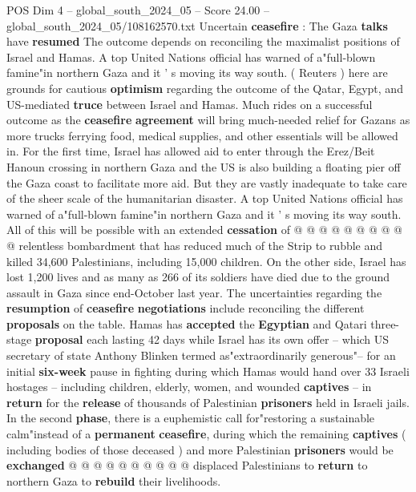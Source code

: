 \begin{textsample}{POS Dim 4 – global\_south\_2024\_05 – Score 24.00 – global\_south\_2024\_05/108162570.txt}  \label{ex:f4_pos_185}
Uncertain \textbf{ceasefire} : The Gaza \textbf{talks} have \textbf{resumed} The outcome depends on reconciling the maximalist positions of Israel and Hamas.
A top United Nations official has warned of a"full-blown famine"in northern Gaza and it ' s moving its way south. ( Reuters ) here are grounds for cautious \textbf{optimism} regarding the outcome of the Qatar, Egypt, and US-mediated \textbf{truce} between Israel and Hamas.
Much rides on a successful outcome as the \textbf{ceasefire} \textbf{agreement} will bring much-needed relief for Gazans as more trucks ferrying food, medical supplies, and other essentials will be allowed in.
For the first time, Israel has allowed aid to enter through the Erez/Beit Hanoun crossing in northern Gaza and the US is also building a floating pier off the Gaza coast to facilitate more aid.
But they are vastly inadequate to take care of the sheer scale of the humanitarian disaster.
A top United Nations official has warned of a"full-blown famine"in northern Gaza and it ' s moving its way south.
All of this will be possible with an extended \textbf{cessation} of @ @ @ @ @ @ @ @ @ @ relentless bombardment that has reduced much of the Strip to rubble and killed 34,600 Palestinians, including 15,000 children.
On the other side, Israel has lost 1,200 lives and as many as 266 of its soldiers have died due to the ground assault in Gaza since end-October last year.
The uncertainties regarding the \textbf{resumption} of \textbf{ceasefire} \textbf{negotiations} include reconciling the different \textbf{proposals} on the table.
Hamas has \textbf{accepted} the \textbf{Egyptian} and Qatari three-stage \textbf{proposal} each lasting 42 days while Israel has its own offer -- which US secretary of state Anthony Blinken termed as"extraordinarily generous"-- for an initial \textbf{six-week} pause in fighting during which Hamas would hand over 33 Israeli hostages -- including children, elderly, women, and wounded \textbf{captives} -- in \textbf{return} for the \textbf{release} of thousands of Palestinian \textbf{prisoners} held in Israeli jails.
In the second \textbf{phase}, there is a euphemistic call for"restoring a sustainable calm"instead of a \textbf{permanent} \textbf{ceasefire}, during which the remaining \textbf{captives} ( including bodies of those deceased ) and more Palestinian \textbf{prisoners} would be \textbf{exchanged} @ @ @ @ @ @ @ @ @ @ displaced Palestinians to \textbf{return} to northern Gaza to \textbf{rebuild} their livelihoods.

\end{textsample}
